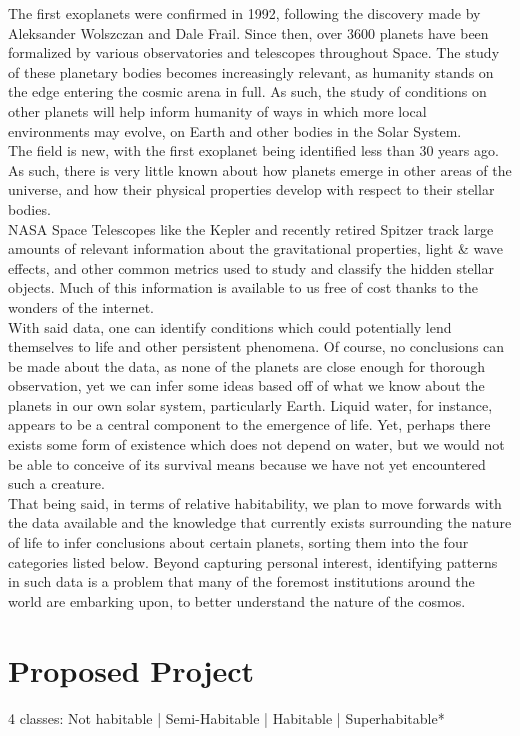 \documentclass[12pt]{article}
\begin{document}
 \indent The first exoplanets were confirmed in 1992, following the discovery made by Aleksander Wolszczan and Dale Frail. Since then, over 3600 planets have been formalized by various observatories and telescopes throughout Space. The study of these planetary bodies becomes increasingly relevant, as humanity stands on the edge entering the cosmic arena in full. As such, the study of conditions on other planets will help inform humanity of ways in which more local environments may evolve, on Earth and other bodies in the Solar System. 
\\
\indent The field is new, with the first exoplanet being identified less than 30 years ago. As such, there is very little known about how planets emerge in other areas of the universe, and how their physical properties develop with respect to their stellar bodies. \\
\indent NASA Space Telescopes like the Kepler and recently retired Spitzer track large amounts of relevant information about the gravitational properties, light \& wave effects, and other common metrics used to study and classify the hidden stellar objects. Much of this information is available to us free of cost thanks to the wonders of the internet. \\
\indent With said data, one can identify conditions which could potentially lend themselves to life and other persistent phenomena. Of course, no conclusions can be made about the data, as none of the planets are close enough for thorough observation, yet we can infer some ideas based off of what we know about the planets in our own solar system, particularly Earth. Liquid water, for instance, appears to be a central component to the emergence of life. Yet, perhaps there exists some form of existence which does not depend on water, but we would not be able to conceive of its survival means because we have not yet encountered such a creature. \\
\indent That being said, in terms of relative habitability, we plan to move forwards with the data available and the knowledge that currently exists surrounding the nature of life to infer conclusions about certain planets, sorting them into the four categories listed below. Beyond capturing personal interest, identifying patterns in such data is a problem that many of the foremost institutions around the world are embarking upon, to better understand the nature of the cosmos. 
\section{Proposed Project}
4 classes: 
Not habitable | Semi-Habitable | Habitable | Superhabitable*
\end{document}
